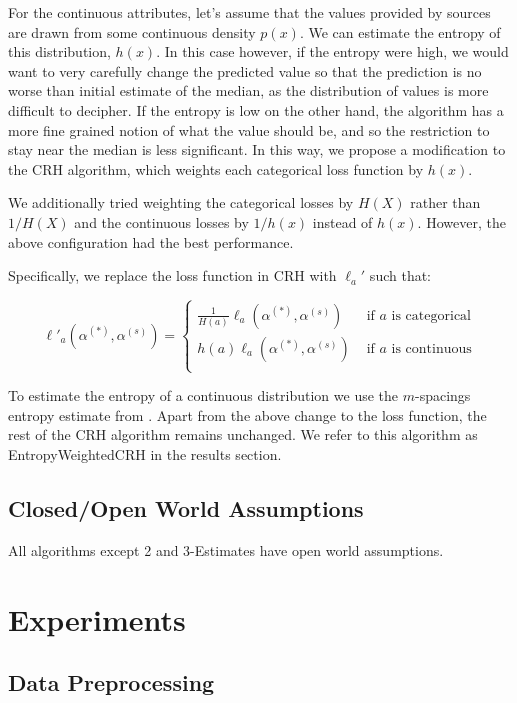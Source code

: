 \documentclass{acm_proc_article-sp}
\begin{document}
For the continuous attributes, let's assume that the values provided by sources are drawn from some continuous density $p(x)$. We can estimate the entropy of this distribution, $h(x)$. In this case however, if the entropy were high, we would want to very carefully change the predicted value so that the prediction is no worse than initial estimate of the median, as the distribution of values is more difficult to decipher. If the entropy is low on the other hand, the algorithm has a more fine grained notion of what the value should be, and so the restriction to stay near the median is less significant. In this way, we propose a modification to the CRH algorithm, which weights each categorical loss function by $h(x)$.

We additionally tried weighting the categorical losses by $H(X)$ rather than $1/H(X)$ and the continuous losses  by $1/h(x)$ instead of $h(x)$. However, the above configuration had the best performance. 

Specifically, we replace the loss function in CRH with $\ell_a'$ such that: 

\begin{equation}
\ell'_a(\alpha^{(*)}, \alpha^{(s)}) = \left\{
     \begin{array}{lr}
       \frac{1}{H(a)} \ell_a(\alpha^{(*)}, \alpha^{(s)})  & \text{ if $a$ is categorical} \\
       h(a) \ell_a(\alpha^{(*)}, \alpha^{(s)})  & \text{ if $a$ is continuous} \\
     \end{array}
   \right.
\end{equation}


To estimate the entropy of a continuous distribution we use the $m$-spacings entropy estimate from \cite{learned2003ica}. Apart from the above change to the loss function, the rest of the CRH algorithm remains unchanged. We refer to this algorithm as {\sc EntropyWeightedCRH} in the results section. 

\subsection{Closed/Open World Assumptions}
All algorithms except 2 and 3-Estimates have open world assumptions. 


\section{Experiments}

\subsection{Data Preprocessing}
\end{document}
